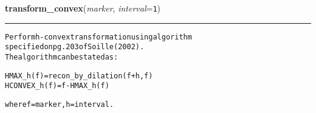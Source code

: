     \begin{boxedminipage}{\textwidth}

    \raggedright \textbf{transform\_convex}(\textit{marker}, \textit{interval}=\texttt{1\-})

    \vspace{-1.5ex}

    \rule{\textwidth}{0.5\fboxrule}
\begin{alltt}
Perform h-convex transformation using algorithm
specified on pg. 203 of Soille (2002).
The algorithm can be stated as:

    HMAX\_h(f) = recon\_by\_dilation(f+h,f)  
    HCONVEX\_h(f) = f - HMAX\_h(f)

where f = marker, h = interval.\end{alltt}

    \vspace{1ex}

    \end{boxedminipage}

